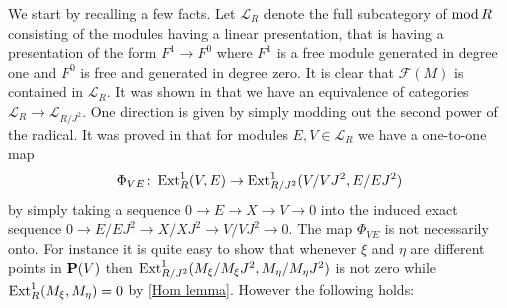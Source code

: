 \documentclass[10pt]{amsart}
\begin{document}
\medskip
 \noindent We start by recalling a few facts. Let $\mathcal L_R$  denote the full
subcategory of $\operatorname{mod} R$ consisting of the modules having a 
linear presentation, that is having a presentation of the form $F^1\rightarrow F^0$ 
where $F^1$ is a free module generated in degree one and $F^0$ is free and 
generated in degree zero.  It is clear that $\mathcal F(M)$ is contained in $\mathcal L_R$. It was shown in \cite{GMRSZ} that we have an equivalence 
of categories $\mathcal L_R\rightarrow\mathcal L_{R/{J^2}}$. One direction is 
given by simply modding out the second power of the radical.  It was proved in 
\cite{HZ} that for modules $E,V\in\mathcal L_R$ we have a one-to-one map 
%
$$\Phi_{VE}\colon\operatorname{Ext}\nolimits^1_R(V,E)\rightarrow\operatorname{Ext}\nolimits^1_{R/{J^2}}(V/{VJ^2},E/{EJ^2})$$
% 
\noindent by simply taking a sequence 
$0\rightarrow E\rightarrow X\rightarrow V\rightarrow 0$ 
into the induced exact sequence 
$0\rightarrow E/{EJ^2}\rightarrow X/{XJ^2}\rightarrow V/{VJ^2}\rightarrow 0$. 
The map $\Phi_{VE}$ is not necessarily onto. 
For instance it is quite easy to show that whenever $\xi$ and $\eta$ are 
different points in ${\bf P}(V)$
then $\operatorname{Ext}\nolimits^1_{R/{J^2}}(M_{\xi}/{M_{\xi}J^2},M_{\eta}/{M_{\eta}J^2})$ 
is not zero while $\operatorname{Ext}\nolimits_R^1(M_{\xi},M_{\eta})=0$ by \ref{Hom lemma}. 
However the following holds:
\end{document}
